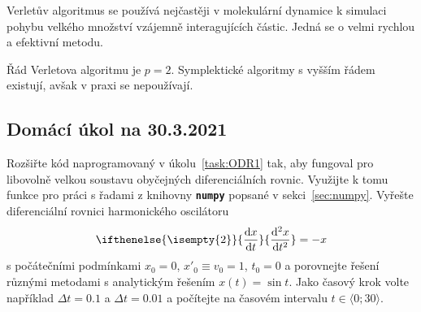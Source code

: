 \documentclass[a4paper,11pt,twoside]{article}
\renewcommand{\d}{\mathrm{d}}
\newcommand{\derivative}[3][]{\ifthenelse{\isempty{#1}}	    %
	{\frac{\d{#2}}{\d{#3}}}
	{\frac{\d^{#1}{#2}}{\d{#3}^{#1}}}
}
\def\file#1{\textnormal{\textbf{\texttt{#1}}}}
\theoremstyle{red}
\theoremstyle{green}
\begin{document}
    Verletův algoritmus se používá nejčastěji v molekulární dynamice k simulaci pohybu velkého množství vzájemně interagujících částic.
    Jedná se o velmi rychlou a efektivní metodu.

    Řád Verletova algoritmu je $p=2$. 
    Symplektické algoritmy s vyšším řádem existují, avšak v praxi se nepoužívají.

\newpage
\subsection*{Domácí úkol na 30.3.2021}
\begin{task}
    Rozšiřte kód naprogramovaný v úkolu~\ref{task:ODR1} tak, aby fungoval pro libovolně velkou soustavu obyčejných diferenciálních rovnic.
    Využijte k tomu funkce pro práci s řadami z knihovny \file{numpy} popsané v sekci~\ref{sec:numpy}.
    Vyřešte diferenciální rovnici harmonického oscilátoru 
    \begin{equation}\label{eq:HO}
        \derivative[2]{x}{t}=-x
    \end{equation}
    s počátečními podmínkami $x_{0}=0$, $x'_{0}\equiv v_{0}=1$, $t_{0}=0$ a porovnejte řešení různými metodami s analytickým řešením $x(t)=\sin t$.
    Jako časový krok volte například $\Delta t=0.1$ a $\Delta t=0.01$ a počítejte na časovém intervalu $t\in\langle 0;30\rangle$.
\end{task}    
\end{document}
